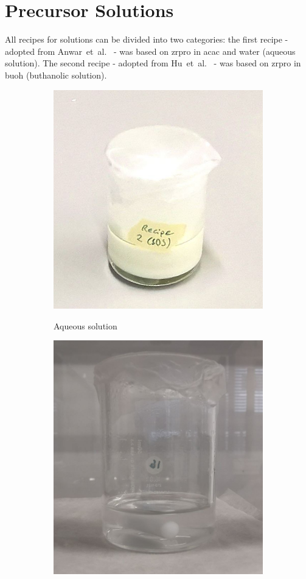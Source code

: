 \section{Precursor Solutions}
\label{sec:exp-sol}
All recipes for solutions can be divided into two categories:
the first recipe - adopted from Anwar~et~al.~\cite{Anwar2017} - was based on \gls{zrpro} in \gls{acac} and \gls{water} (aqueous solution).
The second recipe - adopted from Hu~et~al.~\cite{Hu2016} - was based on \gls{zrpro} in \gls{buoh} (buthanolic solution).

\iffalse
\begin{figure}[htb]
	\centering
	\begin{subfigure}{0.49\textwidth}
		\centering
		\includegraphics[height=0.8\textwidth]{Pics/sol-aq.png}
		\label{fig:sol-aq}
		\caption{Aqueous solution}
	\end{subfigure}
	\begin{subfigure}{0.49\textwidth}
		\centering
		\includegraphics[height=0.8\textwidth]{Pics/sol-bu.png}

\end{subfigure}
\end{figure}
